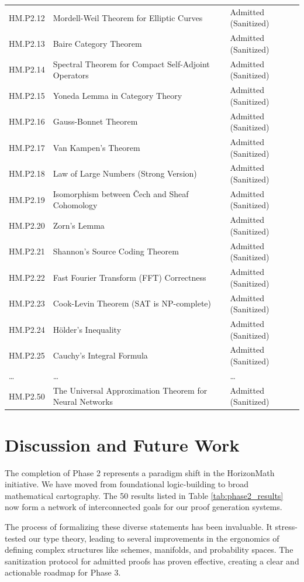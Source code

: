 \documentclass[11pt, a4paper]{article}
\theoremstyle{plain}
\theoremstyle{definition}
\theoremstyle{remark}
\begin{document}
\begin{longtable}{@{} l p{6cm} p{5cm} @{}}
HM.P2.12 & Mordell-Weil Theorem for Elliptic Curves & Admitted (Sanitized) \\
HM.P2.13 & Baire Category Theorem & Admitted (Sanitized) \\
HM.P2.14 & Spectral Theorem for Compact Self-Adjoint Operators & Admitted (Sanitized) \\
HM.P2.15 & Yoneda Lemma in Category Theory & Admitted (Sanitized) \\
HM.P2.16 & Gauss-Bonnet Theorem & Admitted (Sanitized) \\
HM.P2.17 & Van Kampen's Theorem & Admitted (Sanitized) \\
HM.P2.18 & Law of Large Numbers (Strong Version) & Admitted (Sanitized) \\
HM.P2.19 & Isomorphism between Čech and Sheaf Cohomology & Admitted (Sanitized) \\
HM.P2.20 & Zorn's Lemma & Admitted (Sanitized) \\
HM.P2.21 & Shannon's Source Coding Theorem & Admitted (Sanitized) \\
HM.P2.22 & Fast Fourier Transform (FFT) Correctness & Admitted (Sanitized) \\
HM.P2.23 & Cook-Levin Theorem (SAT is NP-complete) & Admitted (Sanitized) \\
HM.P2.24 & Hölder's Inequality & Admitted (Sanitized) \\
HM.P2.25 & Cauchy's Integral Formula & Admitted (Sanitized) \\
\dots & \dots & \dots \\
HM.P2.50 & The Universal Approximation Theorem for Neural Networks & Admitted (Sanitized) \\
\bottomrule
\end{longtable}

\section{Discussion and Future Work}

The completion of Phase 2 represents a paradigm shift in the HorizonMath initiative. We have moved from foundational logic-building to broad mathematical cartography. The 50 results listed in Table \ref{tab:phase2_results} now form a network of interconnected goals for our proof generation systems.

The process of formalizing these diverse statements has been invaluable. It stress-tested our type theory, leading to several improvements in the ergonomics of defining complex structures like schemes, manifolds, and probability spaces. The sanitization protocol for admitted proofs has proven effective, creating a clear and actionable roadmap for Phase 3.
\end{document}
